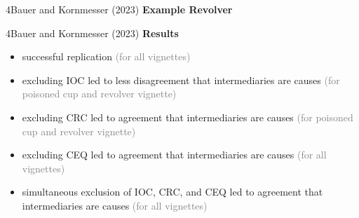 \documentclass[xcolor=table,9pt,aspectratio=169]{beamer}
\begin{document}
\begin{frame}{\vspace*{10mm}4\hspace*{1em}Bauer and Kornmesser (2023)}
\vspace*{-5mm}
\textbf{Example Revolver}\\
\begin{center}
\end{center}
\end{frame}


\begin{frame}{\vspace*{10mm}4\hspace*{1em}Bauer and Kornmesser (2023)}
\vspace*{-5mm}
\textbf{Results}\\
\begin{itemize}
   \item successful replication \textcolor{gray}{(for all vignettes)}
   \item excluding IOC led to less disagreement that intermediaries are causes \textcolor{gray}{(for poisoned cup and revolver vignette)}
   \item excluding CRC led to agreement that intermediaries are causes \textcolor{gray}{(for poisoned cup and revolver vignette)}
   \item excluding CEQ led to agreement that intermediaries are causes \textcolor{gray}{(for all vignettes)}
   \item simultaneous exclusion of IOC, CRC, and CEQ led to agreement that intermediaries are causes \textcolor{gray}{(for all vignettes)}
\end{itemize}
\end{frame}
\end{document}
